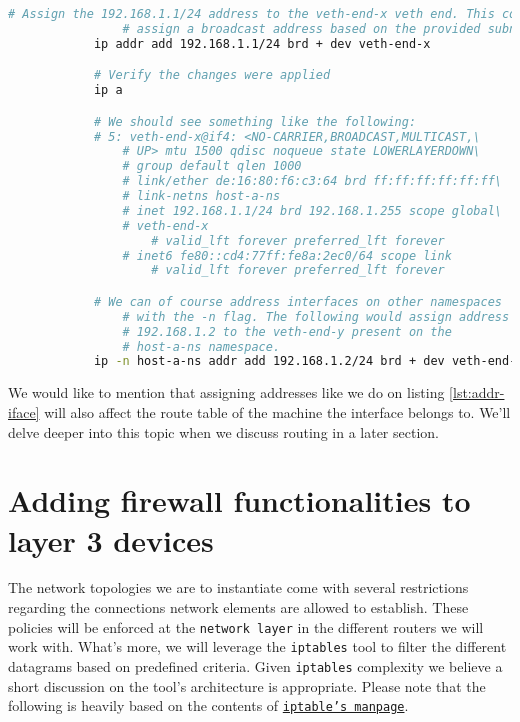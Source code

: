         \begin{lstlisting}[language = bash, caption = Addressing an inetrface., label = lst:addr-iface]
            # Assign the 192.168.1.1/24 address to the veth-end-x veth end. This command will automatically
                # assign a broadcast address based on the provided subnet mask (i.e. /24)
            ip addr add 192.168.1.1/24 brd + dev veth-end-x

            # Verify the changes were applied
            ip a

            # We should see something like the following:
            # 5: veth-end-x@if4: <NO-CARRIER,BROADCAST,MULTICAST,\
                # UP> mtu 1500 qdisc noqueue state LOWERLAYERDOWN\
                # group default qlen 1000
                # link/ether de:16:80:f6:c3:64 brd ff:ff:ff:ff:ff:ff\
                # link-netns host-a-ns
                # inet 192.168.1.1/24 brd 192.168.1.255 scope global\
                # veth-end-x
                    # valid_lft forever preferred_lft forever
                # inet6 fe80::cd4:77ff:fe8a:2ec0/64 scope link
                    # valid_lft forever preferred_lft forever

            # We can of course address interfaces on other namespaces
                # with the -n flag. The following would assign address
                # 192.168.1.2 to the veth-end-y present on the
                # host-a-ns namespace.
            ip -n host-a-ns addr add 192.168.1.2/24 brd + dev veth-end-y
        \end{lstlisting}

        We would like to mention that assigning addresses like we do on listing \ref{lst:addr-iface} will also affect the route table of the machine the interface belongs to. We'll delve deeper into this topic when we discuss routing in a later section.\\

    \section{Adding firewall functionalities to layer 3 devices}
        The network topologies we are to instantiate come with several restrictions regarding the connections network elements are allowed to establish. These policies will be enforced at the \texttt{network layer} in the different routers we will work with. What's more, we will leverage the \texttt{iptables} tool to filter the different datagrams based on predefined criteria. Given \texttt{iptables} complexity we believe a short discussion on the tool's architecture is appropriate. Please note that the following is heavily based on the contents of \href{https://linux.die.net/man/8/iptables}{\texttt{iptable's manpage}}.\\

